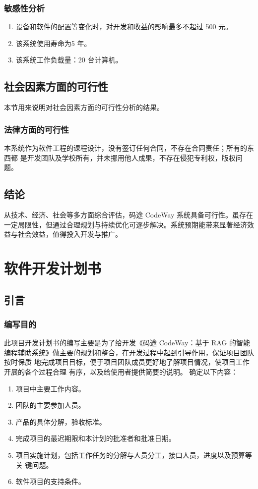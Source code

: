 \documentclass[
    report,     %
    oneside,    %
    UTF8,       %
    zihao=-4    %
]{config} %
\begin{document}
\subsection{敏感性分析}
\begin{enumerate}[label=(\arabic*)]
    \item 设备和软件的配置等变化时，对开发和收益的影响最多不超过 500 元。
    \item 该系统使用寿命为5 年。
    \item 该系统工作负载量：20 台计算机。
\end{enumerate}
\section{社会因素方面的可行性}
本节用来说明对社会因素方面的可行性分析的结果。
\subsection{法律方面的可行性}
本系统作为软件工程的课程设计，没有签订任何合同，不存在合同责任；所有的东西都
是开发团队及学校所有，并未挪用他人成果，不存在侵犯专利权，版权问题。
\section{结论}
从技术、经济、社会等多方面综合评估，码途 CodeWay 系统具备可行性。虽存在一定局限性，但通过合理规划与持续优化可逐步解决。系统预期能带来显著经济效益与社会效益，值得投入开发与推广。

\chapter{软件开发计划书}
\section{引言}
\subsection{编写目的}
此项目开发计划书的编写主要是为了给开发《码途 CodeWay：基于 RAG 的智能编程辅助系统》做主要的规划和整合，在开发过程中起到引导作用，保证项目团队按时保质
地完成项目目标，便于项目团队成员更好地了解项目情况，使项目工作开展的各个过程合理
有序，以及给使用者提供简要的说明。
确定以下内容：
\begin{enumerate}[label=(\arabic*)]
    \item 项目中主要工作内容。
    \item 团队的主要参加人员。
    \item 产品的具体分解，验收标准。
    \item 完成项目的最迟期限和本计划的批准者和批准日期。
    \item 项目实施计划，包括工作任务的分解与人员分工，接口人员，进度以及预算等关
键问题。
    \item 软件项目的支持条件。
\end{enumerate}
\end{document}

